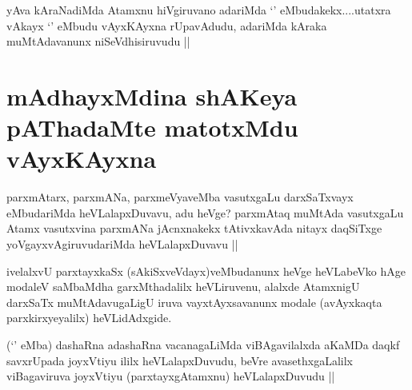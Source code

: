 
\begin{artha}
yAva kAraNadiMda Atamxnu hiVgiruvano adariMda `\stext' eMbudakekx....utatxra vAkayx `\stext' eMbudu vAyxKAyxna rUpavAdudu, adariMda kAraka muMtAdavanunx niSeVdhisiruvudu ||
\end{artha}

\section*{mAdhayxMdina shAKeya pAThadaMte matotxMdu vAyxKAyxna}


\begin{artha}
parxmAtarx, parxmANa, parxmeVyaveMba vasutxgaLu darxSaTxvayx eMbudariMda heVLalapxDuvavu, adu heVge? parxmAtaq muMtAda vasutxgaLu Atamx vasutxvina parxmANa jAcnxnakekx tAtivxkavAda nitayx daqSiTxge yoVgayxvAgiruvudariMda heVLalapxDuvavu ||
\end{artha}

\begin{artha}
ivelalxvU parxtayxkaSx (sAkiSxveVdayx)veMbudanunx heVge heVLabeVko hAge modaleV saMbaMdha garxMthadalilx heVLiruvenu, alalxde AtamxnigU darxSaTx muMtAdavugaLigU iruva vayxtAyxsavanunx modale (avAyxkaqta parxkirxyeyalilx) heVLidAdxgide.
\end{artha}


\begin{artha}
(`\stext' eMba) dashaRna adashaRna vacanagaLiMda viBAgavilalxda aKaMDa daqkf savxrUpada joyxVtiyu ililx heVLalapxDuvudu, beVre avasethxgaLalilx viBagaviruva joyxVtiyu (parxtayxgAtamxnu) heVLalapxDuvudu ||
\end{artha}


